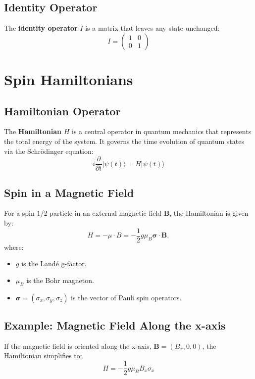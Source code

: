 \documentclass[12pt]{article}
\begin{document}
\subsection{Identity Operator}

The \textbf{identity operator} \( I \) is a matrix that leaves any state unchanged:
\[
I = \begin{pmatrix} 1 & 0 \\ 0 & 1 \end{pmatrix}
\]

\section{Spin Hamiltonians}

\subsection{Hamiltonian Operator}

The \textbf{Hamiltonian} \( H \) is a central operator in quantum mechanics that represents the total energy of the system. It governs the time evolution of quantum states via the Schrödinger equation:
\[
i\frac{\partial}{\partial t} |\psi(t)\rangle = H|\psi(t)\rangle
\]

\subsection{Spin in a Magnetic Field}

For a spin-1/2 particle in an external magnetic field \( \mathbf{B} \), the Hamiltonian is given by:
\[
H = -\mu \cdot B = -\frac{1}{2} g \mu_B \mathbf{\sigma} \cdot \mathbf{B},
\]
where:
\begin{itemize}
    \item \( g \) is the Landé g-factor.
    \item \( \mu_B \) is the Bohr magneton.
    \item \( \mathbf{\sigma} = (\sigma_x, \sigma_y, \sigma_z) \) is the vector of Pauli spin operators.
\end{itemize}

\subsection{Example: Magnetic Field Along the x-axis}

If the magnetic field is oriented along the x-axis, \( \mathbf{B} = (B_x, 0, 0) \), the Hamiltonian simplifies to:
\[
H = -\frac{1}{2} g \mu_B B_x \sigma_x
\]
\end{document}
